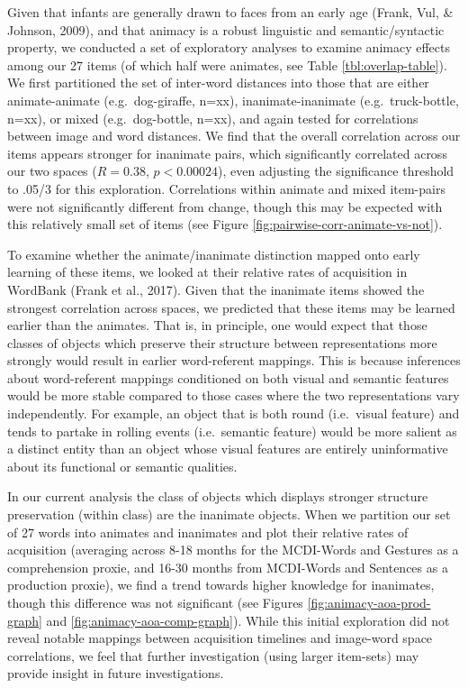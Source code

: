 \documentclass[10pt, letterpaper]{article}
\begin{document}
Given that infants are generally drawn to faces from an early age
(Frank, Vul, \& Johnson, 2009), and that animacy is a robust linguistic
and semantic/syntactic property, we conducted a set of exploratory
analyses to examine animacy effects among our 27 items (of which half
were animates, see Table \ref{tbl:overlap-table}). We first partitioned
the set of inter-word distances into those that are either
animate-animate (e.g.~dog-giraffe, n=xx), inanimate-inanimate
(e.g.~truck-bottle, n=xx), or mixed (e.g.~dog-bottle, n=xx), and again
tested for correlations between image and word distances. We find that
the overall correlation across our items appears stronger for inanimate
pairs, which significantly correlated across our two spaces
(\(R = 0.38\), \(p < 0.00024\)), even adjusting the significance
threshold to .05/3 for this exploration. Correlations within animate and
mixed item-pairs were not significantly different from change, though
this may be expected with this relatively small set of items (see Figure
\ref{fig:pairwise-corr-animate-vs-not}).

To examine whether the animate/inanimate distinction mapped onto early
learning of these items, we looked at their relative rates of
acquisition in WordBank (Frank et al., 2017). Given that the inanimate
items showed the strongest correlation across spaces, we predicted that
these items may be learned earlier than the animates. That is, in
principle, one would expect that those classes of objects which preserve
their structure between representations more strongly would result in
earlier word-referent mappings. This is because inferences about
word-referent mappings conditioned on both visual and semantic features
would be more stable compared to those cases where the two
representations vary independently. For example, an object that is both
round (i.e.~visual feature) and tends to partake in rolling events
(i.e.~semantic feature) would be more salient as a distinct entity than
an object whose visual features are entirely uninformative about its
functional or semantic qualities.

In our current analysis the class of objects which displays stronger
structure preservation (within class) are the inanimate objects. When we
partition our set of 27 words into animates and inanimates and plot
their relative rates of acquisition (averaging across 8-18 months for
the MCDI-Words and Gestures as a comprehension proxie, and 16-30 months
from MCDI-Words and Sentences as a production proxie), we find a trend
towards higher knowledge for inanimates, though this difference was not
significant (see Figures \ref{fig:animacy-aoa-prod-graph} and
\ref{fig:animacy-aoa-comp-graph}). While this initial exploration did
not reveal notable mappings between acquisition timelines and image-word
space correlations, we feel that further investigation (using larger
item-sets) may provide insight in future investigations.
\end{document}

